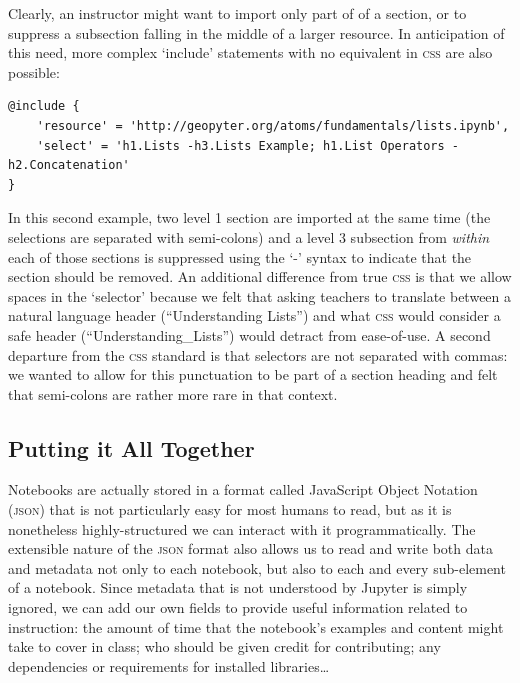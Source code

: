 \documentclass[letter, 11pt,titlepage]{article}
\begin{document}
Clearly, an instructor might want to import only part of of a section, or to
suppress a subsection falling in the middle of a larger resource. In
anticipation of this need, more complex `include' statements with no equivalent
in \textsc{css} are also possible:

\begin{Verbatim}[fontsize=\small]
@include {
    'resource' = 'http://geopyter.org/atoms/fundamentals/lists.ipynb',
    'select' = 'h1.Lists -h3.Lists Example; h1.List Operators -h2.Concatenation'
}
\end{Verbatim}

In this second example, two level 1 section are imported at the same time (the
selections are separated with semi-colons) and a level 3 subsection from
\emph{within} each of those sections is suppressed using the `-' syntax to
indicate that the section should be removed. An additional difference from true
\textsc{css} is that we allow spaces in the `selector' because we felt that
asking teachers to translate between a natural language header (``Understanding
Lists'') and what \textsc{css} would consider a safe header
(``Understanding\_Lists'') would detract from ease-of-use. A second departure
from the \textsc{css} standard is that selectors are not separated with commas:
we wanted to allow for this punctuation to be part of a section heading and felt
that semi-colons are rather more rare in that context.

\subsection{Putting it All Together}

Notebooks are actually stored in a format called JavaScript Object Notation
(\textsc{json}) that is not particularly easy for most humans to read, but as it
is nonetheless highly-structured we can interact with it programmatically. The
extensible nature of the \textsc{json} format also allows us to read and write
both data and metadata not only to each notebook, but also to each and every
sub-element of a notebook. Since metadata that is not understood by Jupyter is
simply ignored, we can add our own fields to provide useful information related
to instruction: the amount of time that the notebook's examples and content
might take to cover in class; who should be given credit for contributing; any
dependencies or requirements for installed libraries\ldots
\end{document}
